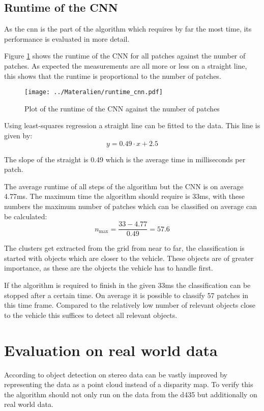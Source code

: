 \subsection{Runtime of the CNN}
As the \ac{cnn} is the part of the algorithm which requires by far the most time, its performance is evaluated in more detail.

Figure \ref{fig:eval:runtime_cnn} shows the runtime of the CNN for all patches against the number of patches. As expected the measurements are all more or less on a straight line, this shows that the runtime is proportional to the number of patches. 

\begin{figure}[h!]
    \centering
    \texttt{[image: ../Materalien/runtime\_cnn.pdf]}
    \caption{Plot of the runtime of the CNN against the number of patches}
    \label{fig:eval:runtime_cnn}
\end{figure}

Using least-squares regression a straight line can be fitted to the data. This line is given by:
\begin{equation}
    y = 0.49 \cdot x + 2.5
\end{equation}

The slope of the straight is 0.49 which is the average time in milliseconds per patch.

The average runtime of all steps of the algorithm but the CNN is on average 4.77ms. 
The maximum time the algorithm should require is 33ms, with these numbers the maximum number of patches which can be classified on average can be calculated:
\begin{equation}
    n_\text{max} = \frac{33 - 4.77}{0.49} = 57.6
\end{equation}

The clusters get extracted from the grid from near to far, the classification is started with objects which are closer to the vehicle. 
These objects are of greater importance, as these are the objects the vehicle has to handle first.

If the algorithm is required to finish in the given 33ms the classification can be stopped after a certain time. 
On average it is possible to classify 57 patches in this time frame. 
Compared to the relatively low number of relevant objects close to the vehicle this suffices to detect all relevant objects.

\section{Evaluation on real world data}
According to \cite{Wang19} object detection on stereo data can be vastly improved by representing the data as a point cloud instead of a disparity map. 
To verify this the algorithm should not only run on the data from the \ac{d435} but additionally on real world data.

